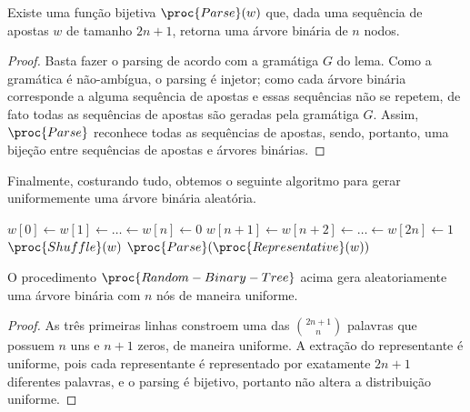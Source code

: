 \begin{corollary}
    Existe uma função bijetiva $\proc{Parse}(w)$
    que, dada uma sequência de apostas $w$ de tamanho $2n+1$,
    retorna uma árvore binária de $n$ nodos.
\end{corollary}

\begin{proof}
    Basta fazer o parsing de acordo com a gramátiga $G$ do lema.
    Como a gramática é não-ambígua,
    o parsing é injetor;
    como cada árvore binária corresponde a alguma sequência de apostas
    e essas sequências não se repetem,
    de fato todas as sequências de apostas são geradas pela gramátiga $G$.
    Assim, $\proc{Parse}$ reconhece todas as sequências de apostas,
    sendo, portanto, uma bijeção entre sequências de apostas e árvores binárias.
\end{proof}

Finalmente, costurando tudo,
obtemos o seguinte algoritmo para gerar uniformemente uma árvore binária aleatória.

\begin{codebox}
    \li $w[0] \gets w[1] \gets \dots \gets w[n] \gets 0$
    \li $w[n+1] \gets w[n+2] \gets \dots \gets w[2n] \gets 1$
    \li $\proc{Shuffle}(w)$
    \li \Return $\proc{Parse}(\proc{Representative}(w))$
\end{codebox}

\begin{theorem}
    O procedimento $\proc{Random-Binary-Tree}$ acima
    gera aleatoriamente uma árvore binária com $n$ nós de maneira uniforme.
\end{theorem}

\begin{proof}
    As três primeiras linhas constroem uma das $\binom{2n+1}{n}$ palavras
    que possuem $n$ uns e $n+1$ zeros,
    de maneira uniforme.
    A extração do representante é uniforme,
    pois cada representante é representado por exatamente $2n+1$ diferentes palavras,
    e o parsing é bijetivo,
    portanto não altera a distribuição uniforme.
\end{proof}
